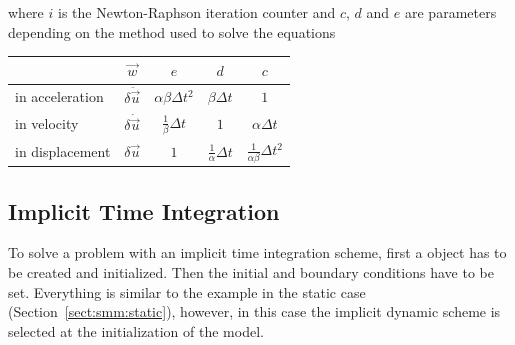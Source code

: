 where $i$ is the Newton-Raphson iteration counter and $c$, $d$ and $e$
are parameters depending on the method used to solve the equations

\begin{center}
  \begin{tabular}{lcccc}
    \toprule
    & $\vec{w}$ & $e$ & $d$ & $c$\\
    \midrule
    in acceleration &$ \delta\ddot{\vec{u}}$ & $\alpha \beta\Delta t^2$ &$\beta \Delta t$ &$1$\\
    in velocity & $ \delta\dot{\vec{u}}$& $\frac{1}{\beta} \Delta t$ & $1$ & $\alpha\Delta t$\\
    in displacement &$\delta\vec{u}$ & $ 1$ & $\frac{1}{\alpha} \Delta t$ & $\frac{1}{\alpha \beta} \Delta t^2$\\
    \bottomrule
  \end{tabular}
\end{center}



\subsection{Implicit Time Integration}
To solve a problem with an implicit time integration scheme, first a
 object has to be created and initialized.
Then the initial and boundary conditions have to be set.  Everything
is similar to the example in the static case
(Section~\ref{sect:smm:static}), however, in this case the implicit
dynamic scheme is selected at the initialization of the model.


